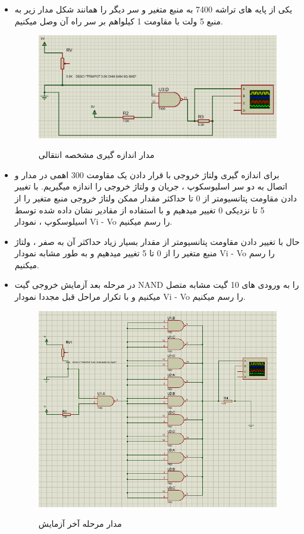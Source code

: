 \documentclass[twoside]{article}
\begin{document}
\begin{itemize}
			\item			
			یکی از پایه های تراشه 7400 به منبع متغیر و سر دیگر را همانند شکل مدار زیر به منبع 5 ولت با مقاومت 1 کیلواهم بر سر راه آن وصل میکنیم.
			\begin{figure}[h!]
				\begin{center}
					\includegraphics[scale=0.3]{first_madar}‎
					\caption{مدار اندازه گیری مشخصه انتقالی}
				\end{center}
			\end{figure} 
			\item
			برای اندازه گیری ولتاژ خروجی با قرار دادن یک مقاومت 300 اهمی در مدار و اتصال به دو سر اسلیوسکوپ ، جریان و ولتاژ خروجی را اندازه میگیریم. با تغییر دادن مقاومت پتانسیومتر از 0 تا حداکثر مقدار ممکن ولتاژ خروجی منبع متغیر را از 5 تا نزدیکی 0 تغییر میدهیم و با استفاده از مقادیر نشان داده شده توسط اسیلوسکوپ ، نمودار Vi - Vo را رسم میکنیم.
			\item
			حال با تغییر دادن مقاومت پتانسیومتر از مقدار بسیار زیاد حداکثر آن به صفر ، ولتاژ منبع متغیر را از 0 تا 5 تغییر میدهیم و به طور مشابه نمودار Vi - Vo را رسم میکنیم.
			
		\item
		در مرحله بعد آزمایش خروجی گیت NAND را به ورودی های 10 گیت مشابه متصل میکنیم و با تکرار مراحل قبل مجددا نمودار Vi - Vo را رسم میکنیم.
		\begin{figure}[h!]
			\begin{center}
				\includegraphics[scale=0.50]{second_madar}‎
				\caption{مدار مرحله آخر آزمایش}
			\end{center}
		\end{figure} 
		\end{itemize}
		
\end{document}

